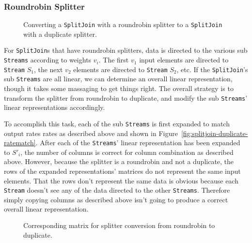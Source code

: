 \subsubsection{Roundrobin Splitter}

\begin{figure}
\center
\epsfxsize=3.0in
\caption{Converting a {\tt SplitJoin} with a roundrobin splitter to a {\tt SplitJoin} with a duplicate splitter.}
\label{fig:splitjoin-roundrobin-to-duplicate}
\end{figure}

For {\tt SplitJoin}s that have roundrobin splitters, data is directed to the various sub {\tt Streams} 
according to weights $v_i$. The first $v_1$ input elements are directed to {\tt Stream} $S_1$, the next
$v_2$ elements are directed to {\tt Stream} $S_2$, etc. If the {\tt SplitJoin}'s sub {\tt Streams} are
all linear, we can determine an overall linear representation, though it takes some massaging to
get things right. The overall strategy is to transform the splitter from roundrobin to duplicate, 
and modify the sub {\tt Streams}' linear representations accordingly. 

To accomplish this task, each of the sub {\tt Streams} is first expanded to match output rates rates 
as described above and shown in Figure~\ref{fig:splitjoin-duplicate-ratematch}. 
After each of the {\tt Streams}' linear representation has been expanded to $S'_i$, the number of
columns is correct for column combination as described above. However, because the splitter is a 
roundrobin and not a duplicate, the rows of the expanded representations' matrices do not represent the
same input elements. That the rows don't represent the same data is obvious because each {\tt Stream} 
doesn't see any of the data directed to the other {\tt Streams}. Therefore simply copying columns 
as described above isn't going to produce a correct overall linear representation. 

\begin{figure}
\center
\epsfxsize=3.0in
\caption{Corresponding matrix for splitter conversion from roundrobin to duplicate.}
\label{fig:splitjoin-roundrobin-matrix}
\end{figure}

